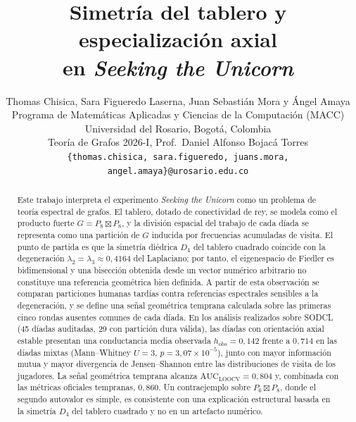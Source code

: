 \documentclass[journal]{IEEEtran}
\begin{document}
\title{Simetría del tablero y especialización axial\\ en \emph{Seeking the Unicorn}}

\author{%
  Thomas Chisica, Sara Figueredo Laserna, Juan Sebastián Mora y Ángel Amaya\\
  Programa de Matemáticas Aplicadas y Ciencias de la Computación (MACC)\\
  Universidad del Rosario, Bogotá, Colombia\\
  Teoría de Grafos 2026-I, Prof.\ Daniel Alfonso Bojacá Torres\\
  \texttt{\{thomas.chisica, sara.figueredo, juans.mora, angel.amaya\}@urosario.edu.co}}

\maketitle

\begin{abstract}
Este trabajo interpreta el experimento \emph{Seeking the Unicorn} como un problema de teoría espectral de grafos. El tablero, dotado de conectividad de rey, se modela como el producto fuerte $G = P_8 \boxtimes P_8$, y la división espacial del trabajo de cada díada se representa como una partición de $G$ inducida por frecuencias acumuladas de visita. El punto de partida es que la simetría diédrica $D_4$ del tablero cuadrado coincide con la degeneración $\lambda_2 = \lambda_3 \approx 0{,}4164$ del Laplaciano; por tanto, el eigenespacio de Fiedler es bidimensional y una bisección obtenida desde un vector numérico arbitrario no constituye una referencia geométrica bien definida. A partir de esta observación se comparan particiones humanas tardías contra referencias espectrales sensibles a la degeneración, y se define una señal geométrica temprana calculada sobre las primeras cinco rondas ausentes comunes de cada díada. En los análisis realizados sobre SODCL (45 díadas auditadas, 29 con partición dura válida), las díadas con orientación axial estable presentan una conductancia media observada $h_{\mathrm{obs}} = 0{,}142$ frente a $0{,}714$ en las díadas mixtas (Mann--Whitney $U=3$, $p = 3{,}07 \times 10^{-5}$), junto con mayor información mutua y mayor divergencia de Jensen--Shannon entre las distribuciones de visita de los jugadores. La señal geométrica temprana alcanza $\mathrm{AUC}_{\mathrm{LOOCV}} = 0{,}804$ y, combinada con las métricas oficiales tempranas, $0{,}860$. Un contraejemplo sobre $P_6 \boxtimes P_8$, donde el segundo autovalor es simple, es consistente con una explicación estructural basada en la simetría $D_4$ del tablero cuadrado y no en un artefacto numérico.
\end{abstract}
\end{document}
